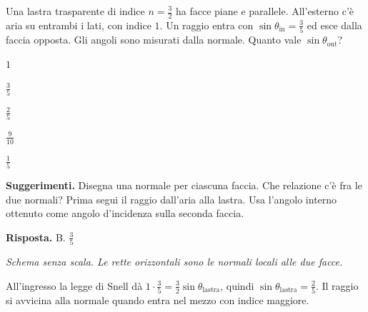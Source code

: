 \documentclass[11pt,a4paper]{article}
\begin{document}
\begin{samepage}
\par\smallskip
Una lastra trasparente di indice \(n=\frac{3}{2}\) ha facce piane e parallele. All’esterno c’è aria su entrambi i lati, con indice \(1\). Un raggio entra con \(\sin\theta_\mathrm{in}=\frac{3}{5}\) ed esce dalla faccia opposta. Gli angoli sono misurati dalla normale. Quanto vale \(\sin\theta_\mathrm{out}\)?\par


\begin{list}{}{\setlength{\leftmargin}{1.4em}\setlength{\itemsep}{.1em}\setlength{\parsep}{0pt}}\small
\item[A.] \(1\)
\item[B.] \(\frac{3}{5}\)
\item[C.] \(\frac{2}{5}\)
\item[D.] \(\frac{9}{10}\)
\item[E.] \(\frac{1}{5}\)
\end{list}
{\small\textbf{Suggerimenti.} Disegna una normale per ciascuna faccia. Che relazione c’è fra le due normali? Prima segui il raggio dall’aria alla lastra. Usa l’angolo interno ottenuto come angolo d’incidenza sulla seconda faccia.\par}
\medskip\noindent\textbf{Risposta.} B. \(\frac{3}{5}\)\par

\begin{center}
\par
\small\itshape Schema senza scala. Le rette orizzontali sono le normali locali alle due facce.
\end{center}
All’ingresso la legge di Snell dà \(1\cdot\frac{3}{5}=\frac{3}{2}\sin\theta_\mathrm{lastra}\), quindi \(\sin\theta_\mathrm{lastra}=\frac{2}{5}\). Il raggio si avvicina alla normale quando entra nel mezzo con indice maggiore.\par


\end{samepage}
\end{document}
